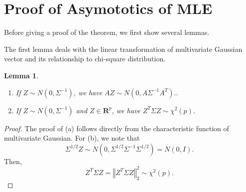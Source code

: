 \documentclass[11pt,letterpaper]{article}
\newcommand{\real}{\mathbf{R}}
\newtheorem{theorem}{Theorem}
\newtheorem{lemma}{Lemma}
\theoremstyle{definition}
\begin{document}
\section{Proof of Asymototics of MLE}
%

Before giving a proof of the theorem, we first show several lemmas. 

The first lemma deals with the linear transformation of multivariate Gaussian vector and its relationship to chi-square distribution.
\begin{lemma}
\label{lemma1}
\begin{enumerate}
	\item[(a)]	If $Z\sim N(0,\Sigma ^{-1})$, we have $AZ\sim N(0,A\Sigma
^{-1}A^{T}).$.
	\item[(b)] If $Z\sim N(0,\Sigma ^{-1})$ and $Z\in \real^{p}$, we have $Z^{T}\Sigma
Z\sim \chi ^{2}(p).$
\end{enumerate}
\end{lemma}
\begin{proof}
	The proof of (a) follows directly from the characteristic function of multivariate Gaussian. For (b),  we note that
\begin{equation*}
\Sigma ^{1/2}Z\sim N(0,\Sigma ^{1/2}\Sigma ^{-1}\Sigma ^{1/2})=N(0,I).
\end{equation*}%
Then,
\begin{equation*}
Z^{T}\Sigma Z=\left\Vert Z^{T}\Sigma Z\right\Vert _{2}^{2}\sim \chi ^{2}(p).
\end{equation*}
\end{proof}
\end{document}
